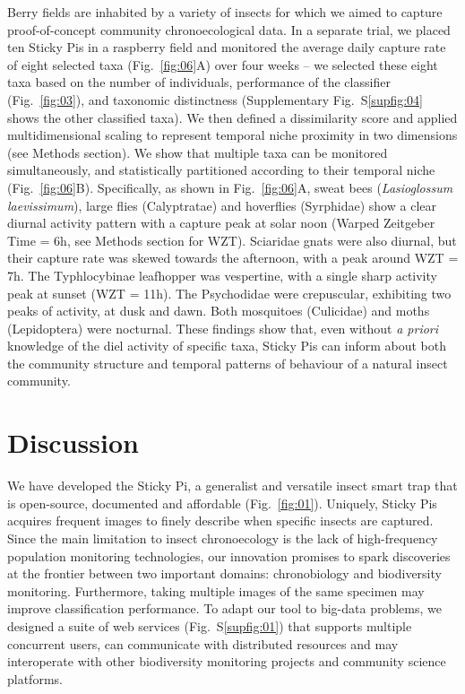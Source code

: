 \documentclass[12pt]{article}
\begin{document}
\begin{linenumbers}
		Berry fields are inhabited by a variety of insects for which we aimed to capture proof-of-concept community chronoecological data. In a separate trial, we placed ten Sticky Pis in a raspberry field and monitored the average daily capture rate of eight selected taxa (Fig.~\ref{fig:06}A) over four weeks – we selected these eight taxa based on the number of individuals, performance of the classifier (Fig.~\ref{fig:03}), and taxonomic distinctness (Supplementary Fig.~S\ref{supfig:04} shows the other classified taxa). We then defined a dissimilarity score and applied multidimensional scaling to represent temporal niche proximity in two dimensions (see Methods section). We show that multiple taxa can be monitored simultaneously, and statistically partitioned according to their temporal niche (Fig.~\ref{fig:06}B). Specifically, as shown in Fig.~\ref{fig:06}A, sweat bees (\emph{Lasioglossum laevissimum}), large flies (Calyptratae) and hoverflies (Syrphidae) show a clear diurnal activity pattern with a capture peak at solar noon (Warped Zeitgeber Time = 6h, see Methods section for WZT). Sciaridae gnats were also diurnal, but their capture rate was skewed towards the afternoon, with a peak around WZT = 7h. The Typhlocybinae leafhopper was vespertine, with a single sharp activity peak at sunset (WZT = 11h). The Psychodidae were crepuscular, exhibiting two peaks of activity, at dusk and dawn. Both mosquitoes (Culicidae) and moths (Lepidoptera) were nocturnal. These findings show that, even without \emph{a priori} knowledge of the diel activity of specific taxa, Sticky Pis can inform about both the community structure and temporal patterns of behaviour of a natural insect community.

		
		\section*{Discussion}

		
		We have developed the Sticky Pi, a generalist and versatile insect smart trap that is open-source, documented and affordable (Fig.~\ref{fig:01}). Uniquely, Sticky Pis acquires frequent images to finely describe when specific insects are captured. Since the main limitation to insect chronoecology is the lack of high-frequency population monitoring technologies\cite{dominoni_methods_2017}, our innovation promises to spark discoveries at the frontier between two important domains: chronobiology and biodiversity monitoring. Furthermore, taking multiple images of the same specimen may improve classification performance. To adapt our tool to big-data problems, we designed a suite of web services (Fig.~S\ref{supfig:01}) that supports multiple concurrent users, can communicate with distributed resources and may interoperate with other biodiversity monitoring projects and community science platforms\cite{pocock_chapter_2018}.


\end{linenumbers}
\end{document}
